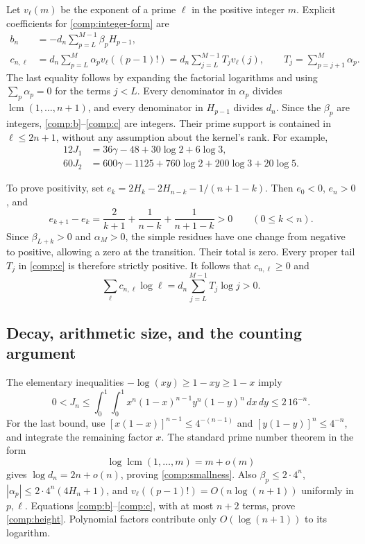 \documentclass[11pt,a4paper]{article}
\theoremstyle{definition}\newtheorem{definition}[theorem]{Definition}
\theoremstyle{remark}\newtheorem{remark}[theorem]{Remark}
\begin{document}
Let $v_\ell(m)$ be the exponent of a prime $\ell$ in the positive
integer $m$.  Explicit coefficients for \eqref{comp:integer-form} are
\begin{align}
 b_n&=-d_n\sum_{p=L}^{M-1}\beta_pH_{p-1},
 \label{comp:b}\\
 c_{n,\ell}
 &=d_n\sum_{p=L}^{M}\alpha_pv_\ell((p-1)!)
 =d_n\sum_{j=L}^{M-1}T_jv_\ell(j),
 \qquad T_j=\sum_{p=j+1}^{M}\alpha_p.
 \label{comp:c}
\end{align}
The last equality follows by expanding the factorial logarithms and
using $\sum_p\alpha_p=0$ for the terms $j<L$.
Every denominator in $\alpha_p$ divides
$\operatorname{lcm}(1,\ldots,n+1)$, and every denominator in
$H_{p-1}$ divides $d_n$.  Since the $\beta_p$ are integers,
\eqref{comp:b}--\eqref{comp:c} are integers.  Their prime support is
contained in $\ell\leq2n+1$, without any assumption about the kernel's
rank.  For example,
\begin{align}
 12J_1&=36\gamma-48+30\log2+6\log3,
 \label{comp:n1}\\
 60J_2&=600\gamma-1125+760\log2+200\log3+20\log5.
 \label{comp:n2}
\end{align}

To prove positivity, set
$e_k=2H_k-2H_{n-k}-1/(n+1-k)$.  Then $e_0<0$, $e_n>0$, and
\[
 e_{k+1}-e_k=
 \frac2{k+1}+\frac1{n-k}+\frac1{n+1-k}>0
 \qquad(0\leq k<n).
\]
Since $\beta_{L+k}>0$ and $\alpha_M>0$, the simple residues have one
change from negative to positive, allowing a zero at the transition.
Their total is zero.  Every proper tail $T_j$ in \eqref{comp:c} is
therefore strictly positive.  It follows that $c_{n,\ell}\geq0$ and
\begin{equation}\label{comp:positive-log}
 \sum_\ell c_{n,\ell}\log\ell
   =d_n\sum_{j=L}^{M-1}T_j\log j>0.
\end{equation}

\subsection{Decay, arithmetic size, and the counting argument}

The elementary inequalities $-\log(xy)\geq1-xy\geq1-x$ imply
\[
 0<J_n\leq\int_0^1\!\int_0^1
 x^n(1-x)^{n-1}y^n(1-y)^n\,dx\,dy
 \leq 2\,16^{-n}.
\]
For the last bound, use
$[x(1-x)]^{n-1}\leq4^{-(n-1)}$ and
$[y(1-y)]^n\leq4^{-n}$, and integrate the remaining factor $x$.
The standard prime number theorem in the form
\[
 \log\operatorname{lcm}(1,\ldots,m)=m+o(m)
\]
gives $\log d_n=2n+o(n)$, proving \eqref{comp:smallness}.
Also $\beta_p\leq2\cdot4^n$,
$|\alpha_p|\leq2\cdot4^n(4H_n+1)$, and
$v_\ell((p-1)!)=O(n\log(n+1))$ uniformly in $p,\ell$.
Equations \eqref{comp:b}--\eqref{comp:c}, with at most $n+2$ terms,
prove \eqref{comp:height}.  Polynomial factors contribute only
$O(\log(n+1))$ to its logarithm.
\end{document}
